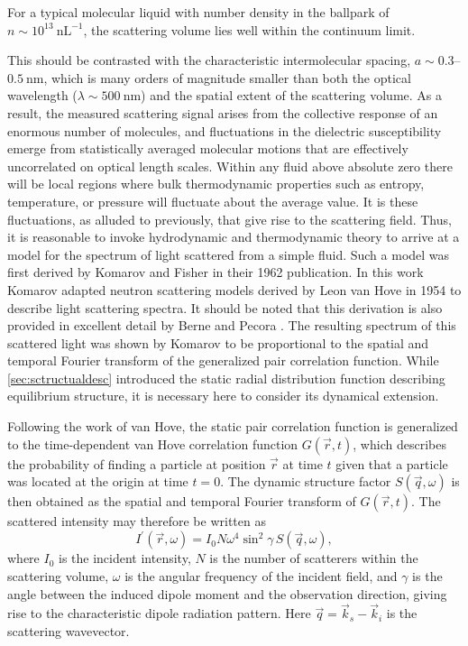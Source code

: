 \noindent For a typical molecular liquid with number density in the ballpark of $n \sim 10^{13}~\text{nL}^{-1}$, the scattering volume lies well within the continuum limit.

This should be contrasted with the characteristic intermolecular spacing, $a \sim 0.3$--$0.5~\text{nm}$, which is many orders of magnitude smaller than both the optical wavelength ($\lambda \sim 500~\text{nm}$) and the spatial extent of the scattering volume. As a result, the measured scattering signal arises from the collective response of an enormous number of molecules, and fluctuations in the dielectric susceptibility emerge from statistically averaged molecular motions that are effectively uncorrelated on optical length scales. Within any fluid above absolute zero there will be local regions where bulk thermodynamic properties such as entropy, temperature, or pressure will fluctuate about the average value.  It is these fluctuations, as alluded to previously, that give rise to the scattering field.  Thus, it is reasonable to invoke hydrodynamic and thermodynamic theory to arrive at a model for the spectrum of light scattered from a simple fluid.  Such a model was first derived by Komarov and Fisher in their 1962 publication\cite{Komarov}. In this work Komarov adapted neutron scattering models derived by Leon van Hove in 1954 to describe light scattering spectra\cite{Hove}. It should be noted that this derivation is also provided in excellent detail by Berne and Pecora \nolinebreak \cite{Berne}.  The resulting spectrum of this scattered light was shown by Komarov to be proportional to the spatial and temporal Fourier transform of the generalized pair correlation function. While \sect \ref{sec:sctructualdesc} introduced the static radial distribution function describing equilibrium structure, it is necessary here to consider its dynamical extension. 

Following the work of van Hove, the static pair correlation function is generalized to the time-dependent van Hove correlation function $G(\vec{r},t)$, which describes the probability of finding a particle at position $\vec{r}$ at time $t$ given that a particle was located at the origin at time $t=0$. The dynamic structure factor $S(\vec{q},\omega)$ is then obtained as the spatial and temporal Fourier transform of $G(\vec{r},t)$. The scattered intensity may therefore be written as
\begin{equation}
	I^\prime\left(\vec{r},\omega\right)
	=
	I_0 N \omega^4 \sin^2{\gamma}\,
	S\left(\vec{q},\omega\right),
\end{equation}
\noindent where $I_0$ is the incident intensity, $N$ is the number of scatterers within the scattering volume, $\omega$ is the angular frequency of the incident field, and $\gamma$ is the angle between the induced dipole moment and the observation direction, giving rise to the characteristic dipole radiation pattern. Here $\vec{q} = \vec{k}_s - \vec{k}_i$ is the scattering wavevector.

